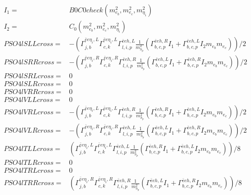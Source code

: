 \documentclass[A4,landscape]{article}
\begin{document}
\begin{align} 
I_1= & B0C0check(m^2_{e_{{b}}}, m^2_{e_{{c}}}, m^2_{\eta_i}) \\ 
I_2= & C_0(m^2_{e_{{b}}}, m^2_{e_{{c}}}, m^2_{\eta_i}) \\ 
  PSO4lSLLcross= & -( \Gamma^{\bar{e}e \eta_i ,L}_{j, b} \Gamma^{\bar{e}e \eta_i ,L}_{c, k} \Gamma^{\bar{e}e h ,L}_{l, i, p} \frac{1}{m^2_{h_{{p}}}} (\Gamma^{\bar{e}e h ,R}_{b, c, p} I_1 + \Gamma^{\bar{e}e h ,L}_{b, c, p} I_2 m_{e_{{b}}} m_{e_{{c}}}))/2 \\ 
  PSO4lSRRcross= & -( \Gamma^{\bar{e}e \eta_i ,R}_{j, b} \Gamma^{\bar{e}e \eta_i ,R}_{c, k} \Gamma^{\bar{e}e h ,R}_{l, i, p} \frac{1}{m^2_{h_{{p}}}} (\Gamma^{\bar{e}e h ,L}_{b, c, p} I_1 + \Gamma^{\bar{e}e h ,R}_{b, c, p} I_2 m_{e_{{b}}} m_{e_{{c}}}))/2 \\ 
  PSO4lSRLcross= & 0 \\ 
  PSO4lSLRcross= & 0 \\ 
  PSO4lVRRcross= & 0 \\ 
  PSO4lVLLcross= & 0 \\ 
  PSO4lVRLcross= & -( \Gamma^{\bar{e}e \eta_i ,L}_{j, b} \Gamma^{\bar{e}e \eta_i ,L}_{c, k} \Gamma^{\bar{e}e h ,R}_{l, i, p} \frac{1}{m^2_{h_{{p}}}} (\Gamma^{\bar{e}e h ,R}_{b, c, p} I_1 + \Gamma^{\bar{e}e h ,L}_{b, c, p} I_2 m_{e_{{b}}} m_{e_{{c}}}))/2 \\ 
  PSO4lVLRcross= & -( \Gamma^{\bar{e}e \eta_i ,R}_{j, b} \Gamma^{\bar{e}e \eta_i ,R}_{c, k} \Gamma^{\bar{e}e h ,L}_{l, i, p} \frac{1}{m^2_{h_{{p}}}} (\Gamma^{\bar{e}e h ,L}_{b, c, p} I_1 + \Gamma^{\bar{e}e h ,R}_{b, c, p} I_2 m_{e_{{b}}} m_{e_{{c}}}))/2 \\ 
  PSO4lTLLcross= & ( \Gamma^{\bar{e}e \eta_i ,L}_{j, b} \Gamma^{\bar{e}e \eta_i ,L}_{c, k} \Gamma^{\bar{e}e h ,L}_{l, i, p} \frac{1}{m^2_{h_{{p}}}} (\Gamma^{\bar{e}e h ,R}_{b, c, p} I_1 + \Gamma^{\bar{e}e h ,L}_{b, c, p} I_2 m_{e_{{b}}} m_{e_{{c}}}))/8 \\ 
  PSO4lTLRcross= & 0 \\ 
  PSO4lTRLcross= & 0 \\ 
  PSO4lTRRcross= & ( \Gamma^{\bar{e}e \eta_i ,R}_{j, b} \Gamma^{\bar{e}e \eta_i ,R}_{c, k} \Gamma^{\bar{e}e h ,R}_{l, i, p} \frac{1}{m^2_{h_{{p}}}} (\Gamma^{\bar{e}e h ,L}_{b, c, p} I_1 + \Gamma^{\bar{e}e h ,R}_{b, c, p} I_2 m_{e_{{b}}} m_{e_{{c}}}))/8 \\ 
\end{align} 
\end{document}

